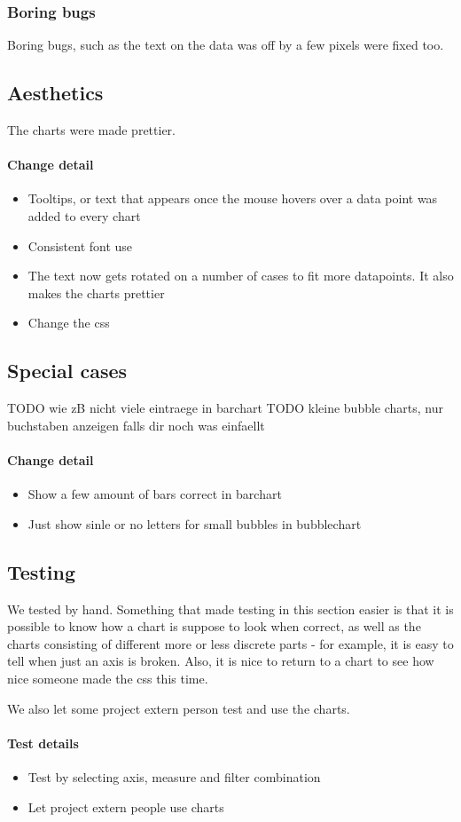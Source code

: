   \subsubsection{Boring bugs}
  Boring bugs, such as the text on the data was off by a few pixels were fixed too.
  
\subsection{Aesthetics}
The charts were made prettier.
  
\paragraph{Change detail}
\begin{itemize}
  \item Tooltips, or text that appears once the mouse hovers over a data point was added to every chart
  \item Consistent font use
  \item The text now gets rotated on a number of cases to fit more datapoints. It also makes the charts prettier
  \item Change the css %
\end{itemize}


\subsection{Special cases}
TODO wie zB nicht viele eintraege in barchart
TODO kleine bubble charts, nur buchstaben anzeigen
falls dir noch was einfaellt

\paragraph{Change detail}
\begin{itemize}
  \item Show a few amount of bars correct in barchart
  \item Just show sinle or no letters for small bubbles in bubblechart
\end{itemize}
  
\subsection{Testing}
 We tested by hand. Something that made testing in this section easier is that it is possible to know
 how a chart is suppose to look when correct, as well as the charts consisting of different more or less discrete
 parts - for example, it is easy to tell when just an axis is broken.
 Also, it is nice to return to a chart to see how nice someone made the css this time. 
 
 We also let some project extern person test and use the charts.

\paragraph{Test details}
\begin{itemize}
  \item Test by selecting axis, measure and filter combination
  \item Let project extern people use charts
\end{itemize}

